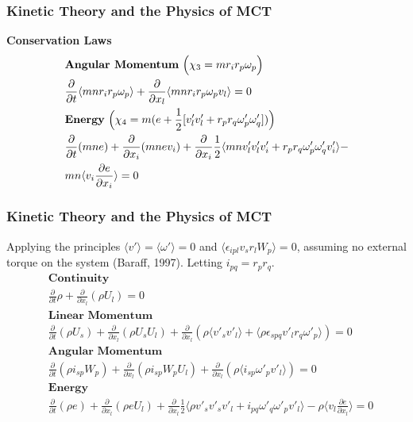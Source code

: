 \documentclass{beamer}
\begin{document}
\begin{frame}
 \frametitle{Kinetic Theory and the Physics of MCT}
 \textbf{\large Conservation Laws}\\
\begin{align*}
\centering
\label{firstorderangmoment}
&\textbf{Angular Momentum} \ \Big(\chi_3 = mr_ir_p\omega_p \Big) \nonumber \\
&\frac{\partial}{\partial t}\langle mn r_{i}r_{p}\omega_p
\rangle + 
\frac{\partial}{\partial x_{l}}\langle mn r_{i}r_{p}\omega_pv_l
\rangle = 0 \\
\label{firstordereenergy}
&\textbf{Energy} \ \Big(\chi_4 = m(e + \frac{1}{2}[v'_lv'_l + 
r_pr_q\omega'_p\omega'_q])\Big) \nonumber \\
&\frac{\partial}{\partial t}(mn e) + \frac{\partial}{\partial 
x_{i}}(mnev_i)   + \frac{\partial}{\partial x_{i}}\frac{1}{2}\langle mn 
v'_{l}v'_{l}v'_{i} + r_{p}r_{q}\omega'_{p}\omega'_{q}v'_{i}
\rangle - \\  &  
mn\langle v_{i}\frac{\partial e}{\partial x_{i}}
\rangle = 0 \nonumber
 \end{align*}
\end{frame}

\begin{frame}
 \frametitle{Kinetic Theory and the Physics of MCT}
 Applying the principles $\langle v'\rangle = \langle \omega'\rangle = 0$ and 
$\langle \epsilon_{ipl} v_s r_{l}W_{p} \rangle = 0$, assuming no external 
torque on the system (Baraff, 1997). Letting $i_{pq} = r_pr_q$.
  \begin{align*}
\label{firstordercont2}
&\textbf{Continuity} \nonumber \\
&\frac{\partial }{\partial t}\rho + \frac{\partial }{\partial 
x_l}(\rho U_l) = 0 \\
\label{firstordermoment2}
&\textbf{Linear Momentum} \nonumber \\ 
&\frac{\partial}{\partial t}(\rho U_s)  + \frac{\partial}{\partial x_l}(\rho 
U_sU_l) + \frac{\partial }{\partial x_l}(\rho \langle v'_s v'_l
\rangle + \langle \rho 
\epsilon_{spq} v'_l r_{q}\omega'_{p}
\rangle) = 0\\
\label{firstorderangmoment2}
&\textbf{Angular Momentum} \nonumber \\ 
&\frac{\partial}{\partial t}(\rho i_{sp}W_p) + 
\frac{\partial}{\partial x_{l}}(\rho i_{sp}W_pU_l) + \frac{\partial}{\partial 
x_{l}}(\rho \langle i_{sp}\omega'_p v'_l
\rangle) = 0 \\ \nonumber 
\label{firstordereenergy2}
&\textbf{Energy} \nonumber \\ 
&\frac{\partial}{\partial t}(\rho e) + \frac{\partial}{\partial 
x_{l}}(\rho eU_l)   + \frac{\partial}{\partial x_{l}}\frac{1}{2}\langle \rho 
v'_{s}v'_{s}v'_{l} + i_{pq}\omega'_{q}\omega'_{p}v'_{l}
\rangle  -  
\rho \langle v_{l}\frac{\partial e}{\partial x_{l}}
\rangle = 0 
\end{align*}
\end{frame}
\end{document}
